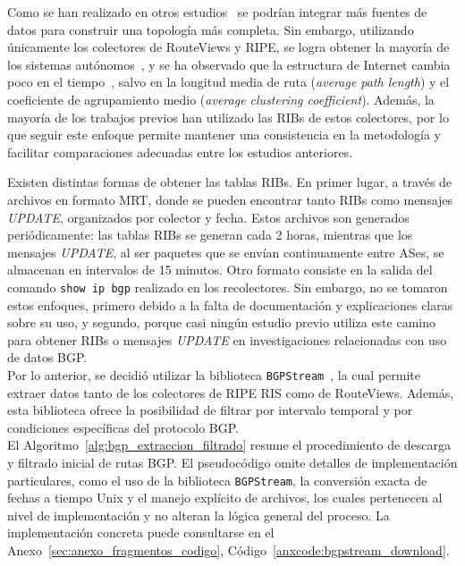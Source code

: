 Como se han realizado en otros estudios~\cite{AS-topology-2004,ExploringtheInternetRoutingRegistriestoAugmentAS-LevelTopology} se podrían integrar más fuentes de datos para construir una topología más completa. Sin embargo, utilizando únicamente los colectores de RouteViews y RIPE, se logra obtener la mayoría de los sistemas autónomos~\cite{AS-topology-2004}, y se ha observado que la estructura de Internet cambia poco en el tiempo~\cite{InterntTopologyOverTime}, salvo en la longitud media de ruta (\textit{average path length}) y el coeficiente de agrupamiento medio (\textit{average clustering coefficient}). Además, la mayoría de los trabajos previos han utilizado las RIBs de estos colectores, por lo que seguir este enfoque permite mantener una consistencia en la metodología y facilitar comparaciones adecuadas entre los estudios anteriores.

Existen distintas formas de obtener las tablas RIBs. En primer lugar, a través de archivos en formato MRT, donde se pueden encontrar tanto RIBs como mensajes \textit{UPDATE}, organizados por colector y fecha. Estos archivos son generados periódicamente: las tablas RIBs se generan cada 2 horas, mientras que los mensajes \textit{UPDATE}, al ser paquetes que se envían continuamente entre ASes, se almacenan en intervalos de 15 minutos. Otro formato consiste en la salida del comando \texttt{show ip bgp} realizado en los recolectores. Sin embargo, no se tomaron estos enfoques, primero debido a la falta de documentación y explicaciones claras sobre su uso, y segundo, porque casi ningún estudio previo utiliza este camino para obtener RIBs o mensajes \textit{UPDATE} en investigaciones relacionadas con uso de datos BGP.\\

Por lo anterior, se decidió utilizar la biblioteca \texttt{BGPStream}~\cite{BGPStream}, la cual permite extraer datos tanto de los colectores de RIPE RIS como de RouteViews. Además, esta biblioteca ofrece la posibilidad de filtrar por intervalo temporal y por condiciones específicas del protocolo BGP.\\

El Algoritmo~\ref{alg:bgp_extraccion_filtrado} resume el procedimiento de descarga y filtrado inicial de rutas BGP. 
El pseudocódigo omite detalles de implementación particulares, como el uso de la biblioteca \texttt{BGPStream}, la conversión exacta de fechas a tiempo Unix y el manejo explícito de archivos, los cuales pertenecen al nivel de implementación y no alteran la lógica general del proceso. La implementación concreta puede consultarse en el Anexo~\ref{sec:anexo_fragmentos_codigo}, Código~\ref{anxcode:bgpstream_download}.

